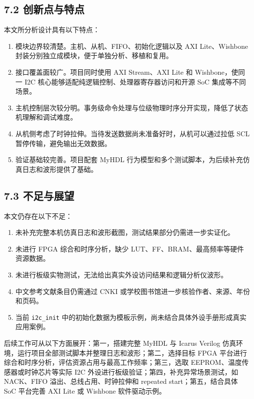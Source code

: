 \subsection{7.2
创新点与特点}\label{ux521bux65b0ux70b9ux4e0eux7279ux70b9}

本文所分析设计具有以下特点：

\begin{enumerate}
\def\labelenumi{\arabic{enumi}.}
\tightlist
\item
  模块边界较清楚。主机、从机、FIFO、初始化逻辑以及 AXI Lite、Wishbone
  封装分别独立成模块，便于单独分析、移植和复用。
\item
  接口覆盖面较广。项目同时使用 AXI Stream、AXI Lite 和 Wishbone，使同一
  I2C 核心能够适配纯逻辑控制、处理器寄存器访问和开源 SoC
  集成等不同场景。
\item
  主机控制层次较分明。事务级命令处理与位级物理时序分开实现，降低了状态机理解和调试难度。
\item
  从机侧考虑了时钟拉伸。当待发送数据尚未准备好时，从机可以通过拉低 SCL
  暂停传输，避免输出无效数据。
\item
  验证基础较完善。项目配套 MyHDL
  行为模型和多个测试脚本，为后续补充仿真日志和波形提供了基础。
\end{enumerate}

\subsection{7.3 不足与展望}\label{ux4e0dux8db3ux4e0eux5c55ux671b}

本文仍存在以下不足：

\begin{enumerate}
\def\labelenumi{\arabic{enumi}.}
\tightlist
\item
  未补充完整本机仿真日志和波形截图，测试结果部分仍需进一步实证化。
\item
  未进行 FPGA 综合和时序分析，缺少
  LUT、FF、BRAM、最高频率等硬件资源数据。
\item
  未进行板级实物测试，无法给出真实外设访问结果和逻辑分析仪波形。
\item
  中文参考文献条目仍需通过 CNKI
  或学校图书馆进一步核验作者、来源、年份和页码。
\item
  当前 \texttt{i2c\_init}
  中的初始化数据为模板示例，尚未结合具体外设手册形成真实应用案例。
\end{enumerate}

后续工作可从以下方面展开：第一，搭建完整 MyHDL 与 Icarus Verilog
仿真环境，运行项目全部测试脚本并整理日志和波形；第二，选择目标 FPGA
平台进行综合和时序分析，评估资源占用与最高工作频率；第三，选取
EEPROM、温度传感器或时钟芯片等实际 I2C
外设进行板级验证；第四，补充异常场景测试，如 NACK、FIFO
溢出、总线占用、时钟拉伸和 repeated start；第五，结合具体 SoC 平台完善
AXI Lite 或 Wishbone 软件驱动示例。

